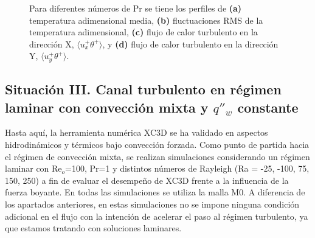 \begin{figure}[H]
 \caption{Para diferentes números de Pr se tiene los perfiles de \textbf{(a)} temperatura adimensional media, \textbf{(b)} fluctuaciones RMS de la temperatura adimensional, \textbf{(c)} flujo de calor turbulento en la dirección X, $\langle u^+_x \theta^+ \rangle$, y \textbf{(d)} flujo de calor turbulento en la dirección Y, $\langle u^+_y \theta^+ \rangle$.} 
 \label{fig:kpr_1}
\end{figure}


\subsection{Situación III. Canal turbulento en régimen laminar con convección mixta y $q''_w$ constante} \label{sec:mix-laminar}

Hasta aquí, la herramienta numérica XC3D se ha validado en aspectos hidrodinámicos y térmicos bajo convección forzada. Como punto de partida hacia el régimen de convección mixta, se realizan simulaciones considerando un régimen laminar con Re$_o$=100, Pr=1 y distintos números de Rayleigh (Ra = -25, -100, 75, 150, 250) a fin de evaluar el desempeño de XC3D frente a la influencia de la fuerza boyante. En todas las simulaciones se utiliza la malla M0. A diferencia de los apartados anteriores, en estas simulaciones no se impone ninguna condición adicional en el flujo con la intención de acelerar el paso al régimen turbulento, ya que estamos tratando con soluciones laminares.

